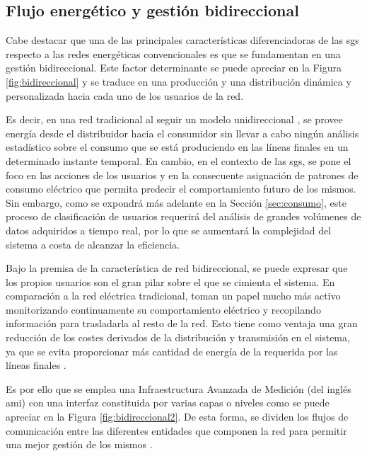 \subsection{Flujo energético y gestión bidireccional}

Cabe destacar que una de las principales características diferenciadoras de las \gls{sg}s respecto a las redes energéticas convencionales es que se fundamentan en una gestión bidireccional. Este factor determinante se puede apreciar en la Figura \ref{fig:bidireccional} y se traduce en una producción y una distribución dinámica y personalizada hacia cada uno de los usuarios de la red. 

\vspace{3mm}

Es decir, en una red tradicional al seguir un modelo unidireccional \cite{conventional}, se provee energía desde el distribuidor hacia el consumidor sin llevar a cabo ningún análisis estadístico sobre el consumo que se está produciendo en las líneas finales en un determinado instante temporal. En cambio, en el contexto de las \gls{sg}s, se pone el foco en las acciones de los usuarios y en la consecuente asignación de patrones de consumo eléctrico que permita predecir el comportamiento futuro de los mismos. Sin embargo, como se expondrá más adelante en la Sección \ref{sec:consumo}, este proceso de clasificación de usuarios requerirá del análisis de grandes volúmenes de datos adquiridos a tiempo real, por lo que se aumentará la complejidad del sistema a costa de alcanzar la eficiencia.

\vspace{3mm}

Bajo la premisa de la característica de red bidireccional, se puede expresar que los propios usuarios son el gran pilar sobre el que se cimienta el sistema. En comparación a la red eléctrica tradicional, toman un papel mucho más activo monitorizando continuamente su comportamiento eléctrico y recopilando información para trasladarla al resto de la red. Esto tiene como ventaja una gran reducción de los costes derivados de la distribución y transmisión en el sistema, ya que se evita proporcionar más cantidad de energía de la requerida por las líneas finales \cite{iotfutura}.

\vspace{3mm}
\pagebreak

Es por ello que se emplea una Infraestructura Avanzada de Medición (del inglés \gls{ami}) con una interfaz constituida por varias capas o niveles como se puede apreciar en la Figura \ref{fig:bidireccional2}. De esta forma, se dividen los flujos de comunicación entre las diferentes entidades que componen la red para permitir una mejor gestión de los mismos \cite{us}.

